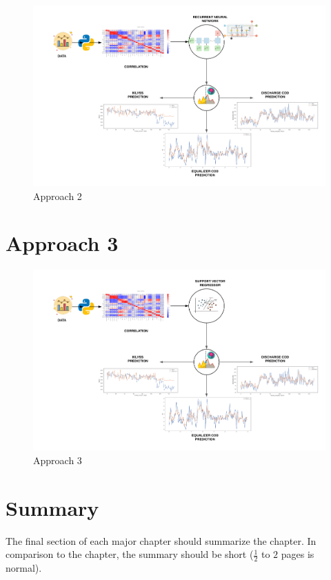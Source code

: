 \begin{figure}[h]
\centering
\includegraphics[width=\linewidth]{figures/Ch4/Approach2.png}
\caption{Approach 2}
\label{f:Approach 2}
\end{figure}

\section{Approach 3}
\label{s:Approach3}

\begin{figure}[h]
\centering
\includegraphics[width=\linewidth]{figures/Ch4/Approach3.png}
\caption{Approach 3}
\label{f:Approach 3}
\end{figure}



\section{Summary}
\label{s:Contribution-1-Summary}

The final section of each major chapter should summarize the chapter. In comparison to the chapter, the summary should be short ($\frac{1}{2}$ to $2$ pages is normal).